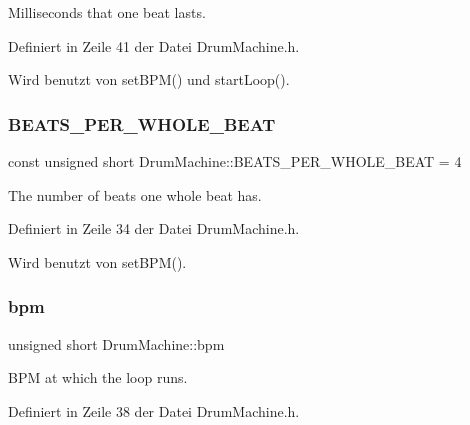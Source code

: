 Milliseconds that one beat lasts. 



Definiert in Zeile 41 der Datei Drum\+Machine.\+h.



Wird benutzt von set\+B\+P\+M() und start\+Loop().

\mbox{\label{class_drum_machine_ab4d2056f29b6eb959aa379afcc6b70f0}} 
\subsubsection{\texorpdfstring{B\+E\+A\+T\+S\+\_\+\+P\+E\+R\+\_\+\+W\+H\+O\+L\+E\+\_\+\+B\+E\+AT}{BEATS\_PER\_WHOLE\_BEAT}}
{\footnotesize\ttfamily const unsigned short Drum\+Machine\+::\+B\+E\+A\+T\+S\+\_\+\+P\+E\+R\+\_\+\+W\+H\+O\+L\+E\+\_\+\+B\+E\+AT = 4\hspace{0.3cm}{\ttfamily [private]}}



The number of beats one whole beat has. 



Definiert in Zeile 34 der Datei Drum\+Machine.\+h.



Wird benutzt von set\+B\+P\+M().

\mbox{\label{class_drum_machine_afaa80be4a66f759ab590a5f67f327b67}} 
\subsubsection{\texorpdfstring{bpm}{bpm}}
{\footnotesize\ttfamily unsigned short Drum\+Machine\+::bpm\hspace{0.3cm}{\ttfamily [private]}}



B\+PM at which the loop runs. 



Definiert in Zeile 38 der Datei Drum\+Machine.\+h.




